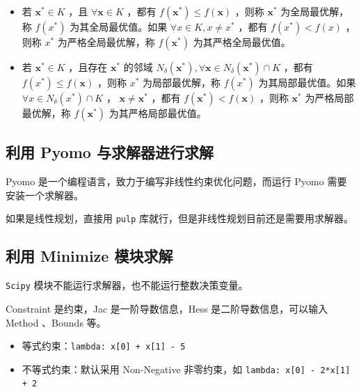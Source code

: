 \begin{definition}[全局最优值]
    \begin{itemize}
        \item 若 $\boldsymbol{x}^* \in K$ ，且 $\forall \boldsymbol{x} \in K$ ，都有 $f\left(\boldsymbol{x}^*\right) \leqslant f(\boldsymbol{x})$ ，则称 $\boldsymbol{x}^*$ 为全局最优解，称 $f\left(x^*\right)$ 为其全局最优值。如果 $\forall x \in K, x \neq x^*$ ，都有 $f\left(x^*\right)<f(x)$ ，则称 $x^*$ 为严格全局最优解，称 $f\left(\boldsymbol{x}^*\right)$ 为其严格全局最优值。
        \item 若 $\boldsymbol{x}^* \in K$ ，且存在 $\boldsymbol{x}^*$ 的邻域 $N_\delta\left(\boldsymbol{x}^*\right), \forall \boldsymbol{x} \in N_\delta\left(\boldsymbol{x}^*\right) \cap K$ ，都有 $f\left(x^*\right) \leqslant f(\boldsymbol{x})$ ，则称 $x^*$ 为局部最优解，称 $f\left(x^*\right)$ 为其局部最优值。如果 $\forall x \in N_\delta\left(x^*\right) \cap K$ ， $\boldsymbol{x} \neq \boldsymbol{x}^*$ ，都有 $f\left(\boldsymbol{x}^*\right)<f(\boldsymbol{x})$ ，则称 $\boldsymbol{x}^*$ 为严格局部最优解，称 $f\left(\boldsymbol{x}^*\right)$ 为其严格局部最优值。
    \end{itemize}
\end{definition}

\subsection{利用 Pyomo 与求解器进行求解}

Pyomo 是一个编程语言，致力于编写非线性约束优化问题，而运行 Pyomo 需要安装一个求解器。

如果是线性规划，直接用 \verb`pulp` 库就行，但是非线性规划目前还是需要用求解器。

\subsection{利用 Minimize 模块求解}

\verb`Scipy` 模块不能运行求解器，也不能运行整数决策变量。

Constraint 是约束，Jac 是一阶导数信息，Hess 是二阶导数信息，可以输入 Method 、Bounds 等。

\begin{theorem}[约束条件]
    \begin{itemize}
        \item 等式约束：\verb|lambda: x[0] + x[1] - 5|
        \item 不等式约束：默认采用 Non-Negative 非零约束，如 \verb|lambda: x[0] - 2*x[1] + 2|
    \end{itemize}
\end{theorem}

